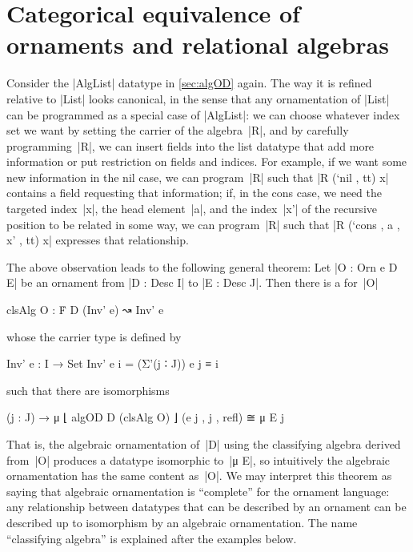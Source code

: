 \chapter{Categorical equivalence of ornaments and relational algebras}
\label{chap:equivalence}

Consider the |AlgList| datatype in \autoref{sec:algOD} again.
The way it is refined relative to |List| looks canonical, in the sense that any ornamentation of |List| can be programmed as a special case of |AlgList|:
we can choose whatever index set we want by setting the carrier of the algebra~|R|, and by carefully programming~|R|, we can insert fields into the list datatype that add more information or put restriction on fields and indices.
For example, if we want some new information in the nil case, we can program~|R| such that |R (`nil , tt) x| contains a field requesting that information; if, in the cons case, we need the targeted index~|x|, the head element~|a|, and the index~|x'| of the recursive position to be related in some way, we can program~|R| such that |R (`cons , a , x' , tt) x| expresses that relationship.

The above observation leads to the following general theorem:
Let |O : Orn e D E| be an ornament from |D : Desc I| to |E : Desc J|.
Then there is a  for~|O|
\begin{code}
clsAlg O : Ḟ D (Inv' e) ↝ Inv' e
\end{code}
whose the carrier type is defined by
\begin{code}
Inv' e : I → Set
Inv' e i = (Σ'(j ∶ J)) e j ≡ i
\end{code}
such that there are isomorphisms
\begin{code}
(j : J) → μ ⌊ algOD D (clsAlg O) ⌋ (e j , j , refl) ≅ μ E j
\end{code}
That is, the algebraic ornamentation of~|D| using the classifying algebra derived from~|O| produces a datatype isomorphic to~|μ E|, so intuitively the algebraic ornamentation has the same content as~|O|.
We may interpret this theorem as saying that algebraic ornamentation is ``complete'' for the ornament language: any relationship between datatypes that can be described by an ornament can be described up to isomorphism by an algebraic ornamentation.
The name ``classifying algebra'' is explained after the examples below.

